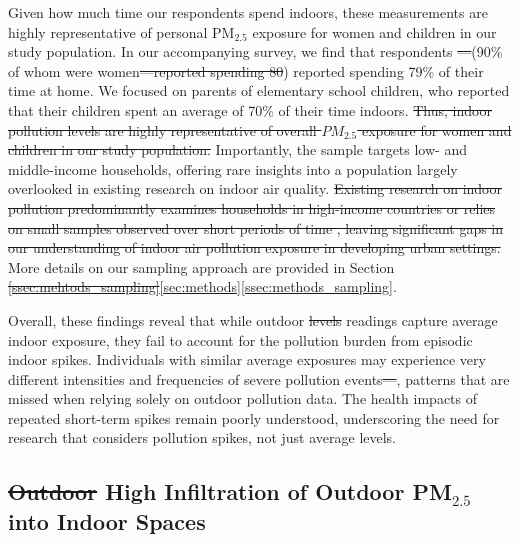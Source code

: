 \documentclass[reqno,12pt,notitlepage]{article}
\providecommand{\DIFadd}[1]{{\protect\color{BLUE}#1}} %
\providecommand{\DIFdel}[1]{{\protect\color{red}\sout{#1}}} %
\providecommand{\DIFaddbegin}{} %
\providecommand{\DIFaddend}{} %
\providecommand{\DIFdelbegin}{} %
\providecommand{\DIFdelend}{} %
\begin{document}
\DIFaddbegin \DIFadd{Given how much time our respondents spend indoors, these measurements are highly representative of personal PM$_{2.5}$ exposure for women and children in our study population. }\DIFaddend In our accompanying survey, we find that respondents \DIFdelbegin \DIFdel{---}\DIFdelend \DIFaddbegin \DIFadd{(}\DIFaddend 90\% of whom were women\DIFdelbegin \DIFdel{---reported spending 80}\DIFdelend \DIFaddbegin \DIFadd{) reported spending 79}\DIFaddend \% of their time at home. We focused on parents of elementary school children, who reported that their children spent an average of 70\% of their time indoors. \DIFdelbegin \DIFdel{Thus, indoor pollution levels are highly representative of overall $PM_{2.5}$ exposure for women and children in our study population. }\DIFdelend Importantly, the sample targets low- and middle-income households, offering rare insights into a population largely overlooked in existing research on indoor air quality. \DIFdelbegin \DIFdel{Existing research on indoor pollution predominantly examines households in high-income countries \citep{krebs_using_2021, lunderberg_assessing_2023, burke_exposures_2022} or relies on small samples observed over short periods of time \citep{lim_comparing_2022}, leaving significant gaps in our understanding of indoor air pollution exposure in developing urban settings. }\DIFdelend More details on our sampling approach are provided in Section \DIFdelbegin \DIFdel{\ref{ssec:mehtods_sampling}}\DIFdelend \DIFaddbegin \DIFadd{\ref{sec:methods}\ref{ssec:methods_sampling}}\DIFaddend .

Overall, these findings reveal that while outdoor \DIFdelbegin \DIFdel{levels }\DIFdelend \DIFaddbegin \DIFadd{readings }\DIFaddend capture average indoor exposure, they fail to account for the pollution burden from episodic indoor spikes. Individuals with similar average exposures may experience very different intensities and frequencies of severe pollution events\DIFdelbegin \DIFdel{---}\DIFdelend \DIFaddbegin \DIFadd{, }\DIFaddend patterns that are missed when relying solely on outdoor pollution data. The health impacts of repeated short-term spikes remain poorly understood, underscoring the need for research that considers pollution spikes, not just average levels.


\subsection{\DIFdelbegin \DIFdel{Outdoor }\DIFdelend \DIFaddbegin \DIFadd{High }\DIFaddend Infiltration \DIFaddbegin \DIFadd{of Outdoor PM$_{2.5}$ }\DIFaddend into Indoor Spaces}
\label{ssec:infiltration}
\end{document}
